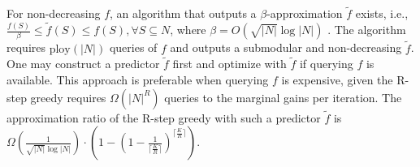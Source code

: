 For non-decreasing $f$, an algorithm that outputs a $\beta$-approximation $\tilde{f}$ exists, i.e., $\frac{f(S)}{\beta} \leq \tilde{f}(S) \leq f(S), \forall S \subseteq N$, where $\beta = O(\sqrt{|N|}\log|N|)$ \cite{approxSubmodularFunctions}. The algorithm requires $\text{ploy}(|N|)$ queries of $f$ and outputs a submodular and non-decreasing $\tilde{f}$. One may construct a predictor $\tilde{f}$ first and optimize with $\tilde{f}$ if querying $f$ is available. 
This approach is preferable when querying $f$ is expensive, given the R-step greedy requires $\Omega(|N|^R)$ queries to the marginal gains per iteration. The approximation ratio of the R-step greedy with such a predictor $\tilde{f}$ is $\Omega(\frac{1}{\sqrt{|N|}\log|N|}) \cdot ( 1 - (1 - \frac{1}{{\lceil \frac{K}{R} \rceil}})^{\lceil \frac{K}{R} \rceil})$. 


